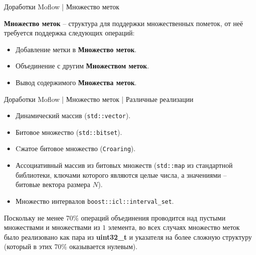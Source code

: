 \documentclass[10pt]{beamer}
\begin{document}
\begin{frame}{Доработки Moflow | Множество меток}
    
    \textbf{Множество меток} -- структура для поддержки множественных пометок, от неё требуется поддержка следующих операций:
    \begin{itemize}
        \item Добавление метки в \textbf{Множество меток}.
        \item Объединение с другим \textbf{Множеством меток}.
        \item Вывод содержимого \textbf{Множества меток}.
     \end{itemize}

\end{frame}

\begin{frame}{Доработки Moflow | Множество меток | Различные реализации }
    \begin{itemize}

        \item Динамический массив (\texttt{std::vector}).
        \item Битовое множество (\texttt{std::bitset}).
        \item Cжатое битовое множество (\texttt{Croaring}).
        \item Ассоциативный массив из битовых множеств (\texttt{std::map} из стандартной библиотеки, ключами которого являются целые числа, а значениями -- битовые вектора размера $N$).
        \item Множество интервалов \texttt{boost::icl::interval\_set}.
     \end{itemize}
     \pause
       Поскольку не менее 70\% операций объединения проводится над пустыми множествами и множествами из $1$ элемента, во всех случаях множество меток было реализовано как пара из \textbf{uint32\_t} и указателя на более сложную структуру (который в этих 70\% оказывается нулевым).

\end{frame}
\end{document}
